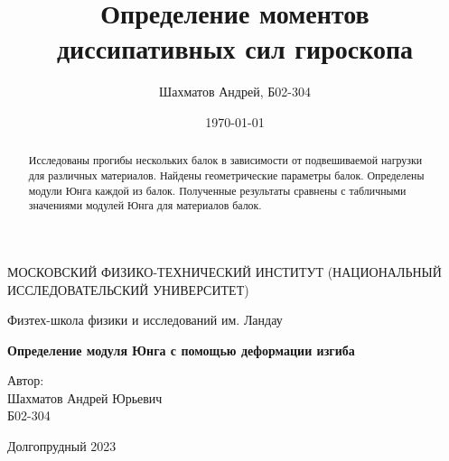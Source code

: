 \documentclass[12pt]{article}
\title{Определение моментов диссипативных сил гироскопа}
\author{Шахматов Андрей, Б02-304}
\date{\today}
\begin{document}
\begin{titlepage}
    \begin{center}
        {\large МОСКОВСКИЙ ФИЗИКО-ТЕХНИЧЕСКИЙ ИНСТИТУТ (НАЦИОНАЛЬНЫЙ ИССЛЕДОВАТЕЛЬСКИЙ УНИВЕРСИТЕТ)}
    \end{center}
    \begin{center}
        {\large Физтех-школа физики и исследований им. Ландау}
    \end{center}
    
    
    \vspace{3cm}
    {\huge
        \begin{center}
            \textbf{Определение модуля Юнга с помощью деформации изгиба}
        \end{center}
    }
    \vspace{2cm}
    \begin{flushright}
        {\LARGE Автор:\\ Шахматов Андрей Юрьевич \\
            \vspace{0.2cm}
            Б02-304}
    \end{flushright}
    \vspace{7 cm}
    \begin{center}
        Долгопрудный 2023
    \end{center}
\end{titlepage}


\begin{abstract}
    Исследованы прогибы нескольких балок в зависимости от подвешиваемой нагрузки для различных материалов. Найдены геометрические параметры балок.
    Определены модули Юнга каждой из балок. Полученные результаты сравнены с табличными значениями модулей Юнга для материалов балок.
\end{abstract}

\tableofcontents
\end{document}
